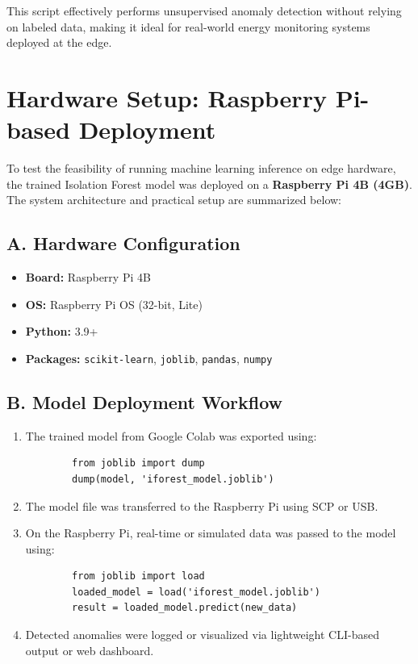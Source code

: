 \documentclass[12pt, draftclsnofoot, onecolumn]{IEEEtran}
\begin{document}
This script effectively performs unsupervised anomaly detection without relying on labeled data, making it ideal for real-world energy monitoring systems deployed at the edge.

\section{Hardware Setup: Raspberry Pi-based Deployment}

To test the feasibility of running machine learning inference on edge hardware, the trained Isolation Forest model was deployed on a \textbf{Raspberry Pi 4B (4GB)}. The system architecture and practical setup are summarized below:

\subsection{A. Hardware Configuration}

\begin{itemize}
	\item \textbf{Board:} Raspberry Pi 4B
	\item \textbf{OS:} Raspberry Pi OS (32-bit, Lite)
	\item \textbf{Python:} 3.9+
	\item \textbf{Packages:} \texttt{scikit-learn}, \texttt{joblib}, \texttt{pandas}, \texttt{numpy}
\end{itemize}

\subsection{B. Model Deployment Workflow}

\begin{enumerate}
	\item The trained model from Google Colab was exported using:
	\begin{verbatim}
		from joblib import dump
		dump(model, 'iforest_model.joblib')
	\end{verbatim}
	
	\item The model file was transferred to the Raspberry Pi using SCP or USB.
	
	\item On the Raspberry Pi, real-time or simulated data was passed to the model using:
	\begin{verbatim}
		from joblib import load
		loaded_model = load('iforest_model.joblib')
		result = loaded_model.predict(new_data)
	\end{verbatim}
	
	\item Detected anomalies were logged or visualized via lightweight CLI-based output or web dashboard.
\end{enumerate}
\end{document}
